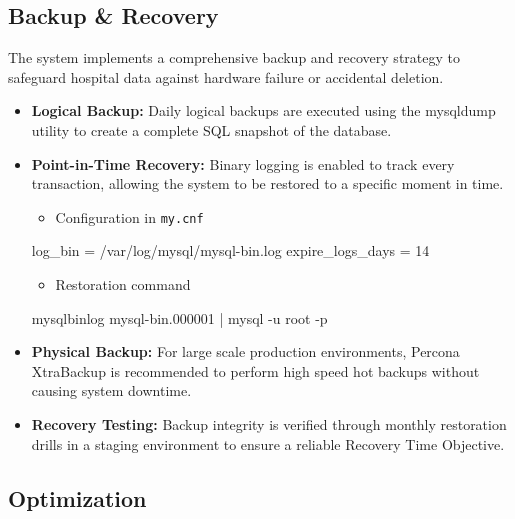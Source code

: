 \subsection{Backup \& Recovery}

The system implements a comprehensive backup and recovery strategy to safeguard hospital data against hardware failure or accidental deletion.
\begin{itemize}
    \item \textbf{Logical Backup:} Daily logical backups are executed using the mysqldump utility to create a complete SQL snapshot of the database.
\end{itemize}


\begin{itemize}
    \item \textbf{Point-in-Time Recovery:} Binary logging is enabled to track every transaction, allowing the system to be restored to a specific moment in time.
    \begin{itemize}
        \item Configuration in \texttt{my.cnf}
    \end{itemize}
    \begin{bashcode}
[mysqld]
log_bin = /var/log/mysql/mysql-bin.log
expire_logs_days = 14
    \end{bashcode}
    \begin{itemize}
        \item Restoration command
    \end{itemize}
    \begin{bashcode}
mysqlbinlog mysql-bin.000001 | mysql -u root -p
    \end{bashcode}
    \item \textbf{Physical Backup:} For large scale production environments, Percona XtraBackup is recommended to perform high speed hot backups without causing system downtime.
    \item \textbf{Recovery Testing:} Backup integrity is verified through monthly restoration drills in a staging environment to ensure a reliable Recovery Time Objective.
\end{itemize}

\subsection{Optimization}

